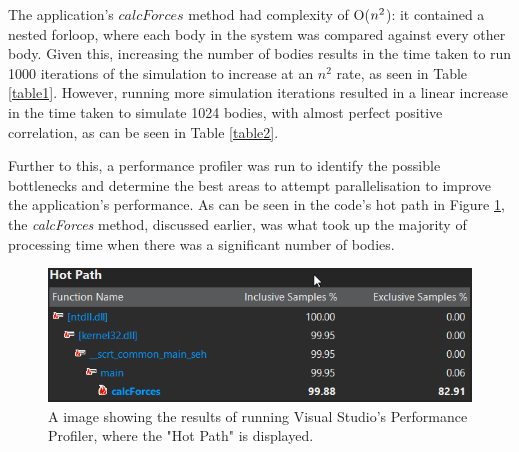 \documentclass[12pt,journal,transmag]{IEEEtran}
\begin{document}
	\begin{table}[!h]
		\caption{1024 bodies Sequential Algorithm Performance}
		\label{table2}
		\centering
	\end{table}
	
	The application's $calcForces$ method had complexity of O($n\textsuperscript{2}$): it contained a nested forloop, where each body in the system was compared against every other body. Given this, increasing the number of bodies results in the time taken to run 1000 iterations of the simulation to increase at an $n^2$ rate, as seen in Table \ref{table1}. However, running more simulation iterations resulted in a linear increase in the time taken to simulate 1024 bodies, with almost perfect positive correlation, as can be seen in Table \ref{table2}.
	
	Further to this, a performance profiler was run to identify the possible bottlenecks and determine the best areas to attempt parallelisation to improve the application's performance. As can be seen in the code's hot path in Figure \ref{figure1}, the \textit{calcForces} method, discussed earlier, was what took up the majority of processing time when there was a significant number of bodies.
	
	\begin{figure}[!h]
		\centering
		\includegraphics[width=\columnwidth]{IMAGES/hotpath}
		\caption{A image showing the results of running Visual Studio's Performance Profiler, where the "Hot Path" is displayed.}
		\label{figure1}
	\end{figure}
	
\end{document}
